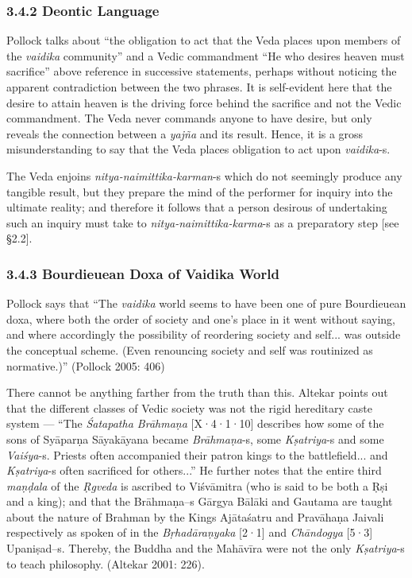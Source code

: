 \subsubsection*{3.4.2 Deontic Language}

Pollock talks about “the obligation to act that the Veda places upon members of the \textit{vaidika} community” and a Vedic commandment “He who desires heaven must sacrifice” above reference in successive statements, perhaps without noticing the apparent contradiction between the two phrases. It is self-evident here that the desire to attain heaven is the driving force behind the sacrifice and not the Vedic commandment. The Veda never commands anyone to have desire, but only reveals the connection between a \textit{yajña} and its result. Hence, it is a gross misunderstanding to say that the Veda places obligation to act upon \textit{vaidika}-s.

The Veda enjoins \textit{nitya-naimittika-karman}-s which do not seemingly produce any tangible result, but they prepare the mind of the performer for inquiry into the ultimate reality; and therefore it follows that a person desirous of undertaking such an inquiry must take to \textit{nitya-naimittika-karma}-s as a preparatory step [see §2.2].


\subsubsection*{3.4.3 Bourdieuean Doxa of Vaidika World}

Pollock says that “The \textit{vaidika} world seems to have been one of pure Bourdieuean doxa, where both the order of society and one’s place in it went without saying, and where accordingly the possibility of reordering society and self... was outside the conceptual scheme. (Even renouncing society and self was routinized as normative.)” (Pollock 2005: 406)

There cannot be anything farther from the truth than this. Altekar points out that the different classes of Vedic society was not the rigid hereditary caste system — “The \textit{Śatapatha Brāhmaṇa} [X·4·1·10] describes how some of the sons of Syāparṇa Sāyakāyana became \textit{Brāhmaṇa}-s, some \textit{Kṣatriya}-s and some \textit{Vaiśya}-s. Priests often accompanied their patron kings to the battlefield... and \textit{Kṣatriya}-s often sacrificed for others...” He further notes that the entire third \textit{maṇḍala} of the \textit{Ṛgveda} is ascribed to Viśvāmitra (who is said to be both a Ṛṣi and a king); and that the Brāhmaṇa--s Gārgya Bālāki and Gautama are taught about the nature of Brahman by the Kings Ajātaśatru and Pravāhaṇa Jaivali respectively as spoken of in the \textit{Bṛhadāraṇyaka} [2·1] and \textit{Chāndogya} [5·3] Upaniṣad--s. Thereby, the Buddha and the Mahāvīra were not the only \textit{Kṣatriya}-s to teach philosophy. (Altekar 2001: 226).

